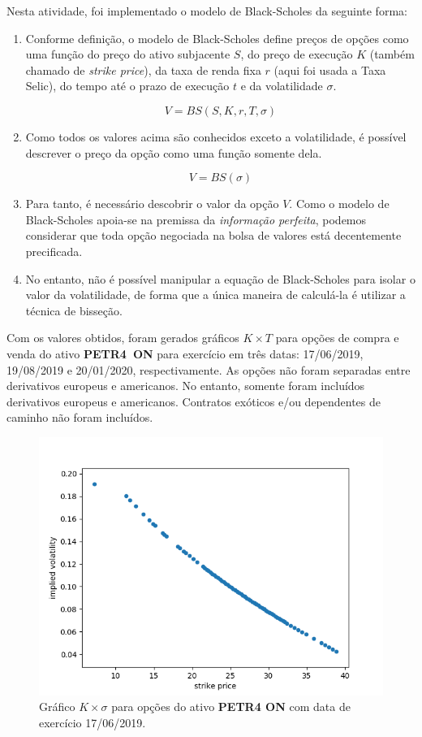 \documentclass{article}
\begin{document}
Nesta atividade, foi implementado o modelo de Black-Scholes da seguinte forma:

\begin{enumerate}
	\item Conforme definição, o modelo de Black-Scholes define preços de opções como uma função do preço do ativo subjacente $S$, do preço de execução $K$ (também chamado de \emph{strike price}), da taxa de renda fixa $r$ (aqui foi usada a Taxa Selic), do tempo até o prazo de execução $t$ e da volatilidade $\sigma$.
	
	\[V = BS(S,K,r,T,\sigma)\]

	\item Como todos os valores acima são conhecidos exceto a volatilidade, é possível descrever o preço da opção como uma função somente dela.
		
	\[V = BS(\sigma)\]

	\item Para tanto, é necessário descobrir o valor da opção $V$. Como o modelo de Black-Scholes apoia-se na premissa da \emph{informação perfeita}, podemos considerar que toda opção negociada na bolsa de valores está decentemente precificada.
	\item No entanto, não é possível manipular a equação de Black-Scholes para isolar o valor da volatilidade, de forma que a única maneira de calculá-la é utilizar a técnica de bisseção. 
\end{enumerate}

Com os valores obtidos, foram gerados gráficos $K \times T$ para opções de compra e venda do ativo \textbf{PETR4\ ON} para exercício em três datas: 17/06/2019, 19/08/2019 e 20/01/2020, respectivamente.
As opções não foram separadas entre derivativos europeus e americanos.
No entanto, somente foram incluídos derivativos europeus e americanos.
Contratos exóticos e/ou dependentes de caminho não foram incluídos.



\begin{figure}[]
	\includegraphics[width=0.9\linewidth]{Figure_0.png}
	\centering
	
	\caption{Gráfico $K \times \sigma$ para opções do ativo \textbf{PETR4 ON} com data de exercício 17/06/2019.}
	\label{}
\end{figure}
\end{document}
